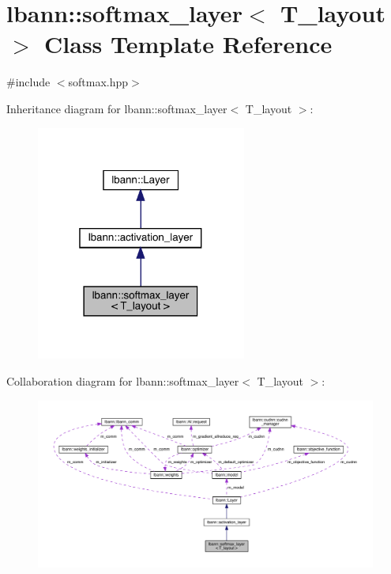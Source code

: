 \hypertarget{classlbann_1_1softmax__layer}{}\section{lbann\+:\+:softmax\+\_\+layer$<$ T\+\_\+layout $>$ Class Template Reference}
\label{classlbann_1_1softmax__layer}


{\ttfamily \#include $<$softmax.\+hpp$>$}



Inheritance diagram for lbann\+:\+:softmax\+\_\+layer$<$ T\+\_\+layout $>$\+:\nopagebreak
\begin{figure}[H]
\begin{center}
\leavevmode
\includegraphics[width=196pt]{classlbann_1_1softmax__layer__inherit__graph}
\end{center}
\end{figure}


Collaboration diagram for lbann\+:\+:softmax\+\_\+layer$<$ T\+\_\+layout $>$\+:\nopagebreak
\begin{figure}[H]
\begin{center}
\leavevmode
\includegraphics[width=350pt]{classlbann_1_1softmax__layer__coll__graph}
\end{center}
\end{figure}
